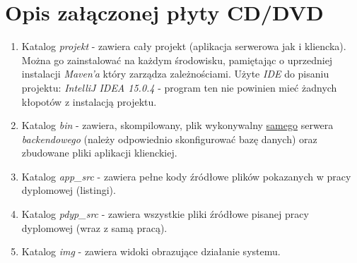 \documentclass[10pt,titlepage]{article} %
\begin{document}
\mbox{}
\thispagestyle{empty}
\newpage

\appendix
\section{Opis załączonej płyty CD/DVD}
\begin{enumerate}[$\bullet$]
\item Katalog \textit{projekt} - zawiera cały projekt (aplikacja serwerowa jak i kliencka). Można go zainstalować na każdym środowisku, pamiętając o uprzedniej instalacji \textit{Maven'a} który zarządza zależnościami. Użyte \textit{IDE} do pisaniu projektu: \textit{IntelliJ IDEA 15.0.4} - program ten nie powinien mieć żadnych kłopotów z instalacją projektu.
\item Katalog \textit{bin} - zawiera, skompilowany, plik wykonywalny \underline{samego} serwera \textit{backendowego} (należy odpowiednio skonfigurować bazę danych) oraz zbudowane pliki aplikacji klienckiej.
\item Katalog \textit{app\_src} - zawiera pełne kody źródłowe plików pokazanych w pracy dyplomowej (listingi). 
\item Katalog \textit{pdyp\_src} - zawiera wszystkie pliki źródłowe pisanej pracy dyplomowej (wraz z samą pracą).
\item Katalog \textit{img} - zawiera widoki obrazujące działanie systemu.
\end{enumerate}
\end{document}
